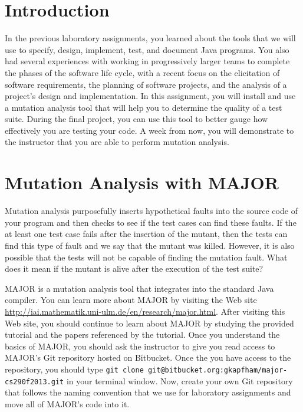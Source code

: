 

\usepackage[compact]{titlesec}



\section*{Introduction}

In the previous laboratory assignments, you learned about the tools that we will use to specify, design, implement,
test, and document Java programs.  You also had several experiences with working in progressively larger teams to
complete the phases of the software life cycle, with a recent focus on the elicitation of software requirements, the
planning of software projects, and the analysis of a project's design and implementation.  In this assignment, you will
install and use a mutation analysis tool that will help you to determine the quality of a test suite.  During the final
project, you can use this tool to better gauge how effectively you are testing your code. A week from now, you will
demonstrate to the instructor that you are able to perform mutation analysis.

\section*{Mutation Analysis with MAJOR}

Mutation analysis purposefully inserts hypothetical faults into the source code of your program and then checks to see
if the test cases can find these faults.  If the at least one test case fails after the insertion of the mutant, then
the tests can find this type of fault and we say that the mutant was killed.  However, it is also possible that the
tests will not be capable of finding the mutation fault. What does it mean if the mutant is alive after the execution of
the test suite?

MAJOR is a mutation analysis tool that integrates into the standard Java compiler. You can learn more about MAJOR by
visiting the Web site \url{http://iai.mathematik.uni-ulm.de/en/research/major.html}.  After visiting this Web site, you
should continue to learn about MAJOR by studying the provided tutorial and the papers referenced by the tutorial.  Once
you understand the basics of MAJOR, you should ask the instructor to give you read access to MAJOR's Git repository
hosted on Bitbucket. Once the you have access to the repository, you should type {\tt git clone
git@bitbucket.org:gkapfham/major-cs290f2013.git} in your terminal window.  Now, create your own Git repository that
follows the naming convention that we use for laboratory assignments and move all of MAJOR's code into it. 



